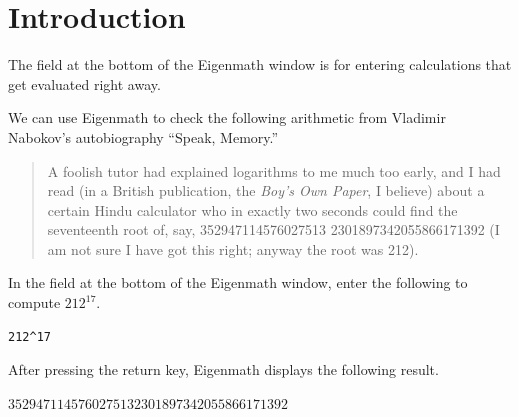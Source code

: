 \section{Introduction}

\noindent
The field at the bottom of the Eigenmath window is for entering
calculations that get evaluated right away.

\begin{center}
\end{center}

\noindent
We can use Eigenmath to check the following arithmetic from
Vladimir Nabokov's autobiography ``Speak, Memory.''

\begin{quote}
A foolish tutor had explained logarithms to me much too early, and I had
read (in a British publication, the {\it Boy's Own Paper}, I believe)
about a certain Hindu calculator who in exactly two seconds could find the
seventeenth root of, say,
352947114576027513 2301897342055866171392
(I am not sure I have got this right; anyway the root was 212).
\end{quote}

\noindent
In the field at the bottom of the Eigenmath window,
enter the following to compute $212^{17}$.

{\color{blue}
\begin{verbatim}
212^17
\end{verbatim}
}

\noindent
After pressing the return key, Eigenmath displays the following result.

\bigskip
\noindent
$3529471145760275132301897342055866171392$

